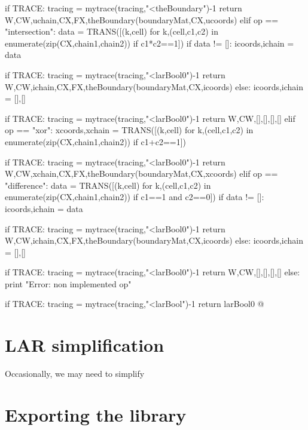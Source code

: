 \documentclass[11pt,oneside]{article}	%
\begin{document}
{			if TRACE: tracing = mytrace(tracing,"<theBoundary")-1
			return W,CW,uchain,CX,FX,theBoundary(boundaryMat,CX,ucoords)
		elif op == "intersection": 
			data = TRANS([(k,cell) for k,(cell,c1,c2) in enumerate(zip(CX,chain1,chain2)) if c1*c2==1])
			if data != []: 
				icoords,ichain = data

				if TRACE: tracing = mytrace(tracing,"<larBool0")-1
				return W,CW,ichain,CX,FX,theBoundary(boundaryMat,CX,icoords)
			else: 
				icoords,ichain = [],[]

				if TRACE: tracing = mytrace(tracing,"<larBool0")-1
				return W,CW,[],[],[],[]
		elif op == "xor": 
			xcoords,xchain = TRANS([(k,cell) for k,(cell,c1,c2) in enumerate(zip(CX,chain1,chain2)) if c1+c2==1])

			if TRACE: tracing = mytrace(tracing,"<larBool0")-1
			return W,CW,xchain,CX,FX,theBoundary(boundaryMat,CX,xcoords)
		elif op == "difference": 
			data = TRANS([(k,cell) for k,(cell,c1,c2) in enumerate(zip(CX,chain1,chain2)) if c1==1 and c2==0])
			if data != []: 
				icoords,ichain = data

				if TRACE: tracing = mytrace(tracing,"<larBool0")-1
				return W,CW,ichain,CX,FX,theBoundary(boundaryMat,CX,icoords)
			else: 
				icoords,ichain = [],[]

				if TRACE: tracing = mytrace(tracing,"<larBool0")-1
				return W,CW,[],[],[],[]
		else: print "Error: non implemented op"


	if TRACE: tracing = mytrace(tracing,"<larBool")-1
	return larBool0
@}


\section{LAR simplification}

Occasionally, we may need to simplify 

\section{Exporting the library}
\end{document}
